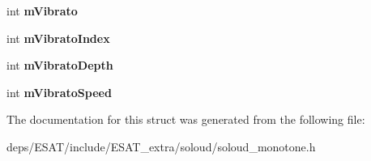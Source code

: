 \begin{DoxyCompactItemize}
\item 
\mbox{\label{struct_so_loud_1_1_monotone_channel_a3adecd373817c6e7b0ea7094afa2b1ce}} 
int {\bfseries m\+Vibrato}
\item 
\mbox{\label{struct_so_loud_1_1_monotone_channel_a94f4e3f3b0e29be984095096eb2dc8df}} 
int {\bfseries m\+Vibrato\+Index}
\item 
\mbox{\label{struct_so_loud_1_1_monotone_channel_a66ebdfe63337b787f05901eff3600170}} 
int {\bfseries m\+Vibrato\+Depth}
\item 
\mbox{\label{struct_so_loud_1_1_monotone_channel_adf9dce6bb6f6de8c898fe1dc56b7d367}} 
int {\bfseries m\+Vibrato\+Speed}
\end{DoxyCompactItemize}


The documentation for this struct was generated from the following file\+:\begin{DoxyCompactItemize}
\item 
deps/\+E\+S\+A\+T/include/\+E\+S\+A\+T\+\_\+extra/soloud/soloud\+\_\+monotone.\+h\end{DoxyCompactItemize}
